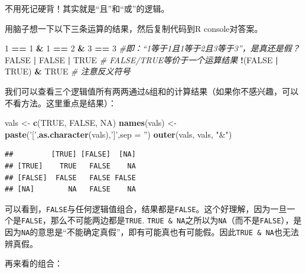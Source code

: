 \documentclass[]{book}
\newenvironment{Shaded}{\begin{snugshade}}{\end{snugshade}}
\newcommand{\CommentTok}[1]{\textcolor[rgb]{0.56,0.35,0.01}{\textit{#1}}}
\newcommand{\DataTypeTok}[1]{\textcolor[rgb]{0.13,0.29,0.53}{#1}}
\newcommand{\DecValTok}[1]{\textcolor[rgb]{0.00,0.00,0.81}{#1}}
\newcommand{\KeywordTok}[1]{\textcolor[rgb]{0.13,0.29,0.53}{\textbf{#1}}}
\newcommand{\NormalTok}[1]{#1}
\newcommand{\OperatorTok}[1]{\textcolor[rgb]{0.81,0.36,0.00}{\textbf{#1}}}
\newcommand{\OtherTok}[1]{\textcolor[rgb]{0.56,0.35,0.01}{#1}}
\newcommand{\StringTok}[1]{\textcolor[rgb]{0.31,0.60,0.02}{#1}}
\begin{document}
不用死记硬背！其实就是``且''和``或''的逻辑。

用脑子想一下以下三条运算的结果，然后复制代码到R console对答案。

\begin{Shaded}
\begin{Highlighting}[]
\DecValTok{1} \OperatorTok{==}\StringTok{ }\DecValTok{1} \OperatorTok{&}\StringTok{ }\DecValTok{1} \OperatorTok{==}\StringTok{ }\DecValTok{2} \OperatorTok{&}\StringTok{ }\DecValTok{3} \OperatorTok{==}\StringTok{ }\DecValTok{3} \CommentTok{#即：“1等于1且1等于2且3等于3”，是真还是假？}
\OtherTok{FALSE} \OperatorTok{|}\StringTok{ }\OtherTok{FALSE} \OperatorTok{|}\StringTok{ }\OtherTok{TRUE} \CommentTok{# FALSE/TRUE等价于一个运算结果}
\OperatorTok{!}\NormalTok{(}\OtherTok{FALSE} \OperatorTok{|}\StringTok{ }\OtherTok{TRUE}\NormalTok{) }\OperatorTok{&}\StringTok{ }\OtherTok{TRUE} \CommentTok{# 注意反义符号}
\end{Highlighting}
\end{Shaded}

我们可以查看三个逻辑值所有两两通过\texttt{\&}组和的计算结果（如果你不感兴趣，可以不看方法。这里重点是结果）：

\begin{Shaded}
\begin{Highlighting}[]
\NormalTok{vals <-}\StringTok{ }\KeywordTok{c}\NormalTok{(}\OtherTok{TRUE}\NormalTok{, }\OtherTok{FALSE}\NormalTok{, }\OtherTok{NA}\NormalTok{) }
\KeywordTok{names}\NormalTok{(vals) <-}\StringTok{ }\KeywordTok{paste}\NormalTok{(}\StringTok{'['}\NormalTok{,}\KeywordTok{as.character}\NormalTok{(vals),}\StringTok{']'}\NormalTok{,}\DataTypeTok{sep =} \StringTok{''}\NormalTok{)}
\KeywordTok{outer}\NormalTok{(vals, vals, }\StringTok{"&"}\NormalTok{)}
\end{Highlighting}
\end{Shaded}

\begin{verbatim}
##         [TRUE] [FALSE]  [NA]
## [TRUE]    TRUE   FALSE    NA
## [FALSE]  FALSE   FALSE FALSE
## [NA]        NA   FALSE    NA
\end{verbatim}

可以看到，\texttt{FALSE}与任何逻辑值组合，结果都是\texttt{FALSE}。这个好理解，因为一旦一个是\texttt{FALSE}，那么不可能两边都是\texttt{TRUE}. \texttt{TRUE\ \&\ NA}之所以为\texttt{NA}（而不是\texttt{FALSE}），是因为\texttt{NA}的意思是``不能确定真假''，即有可能真也有可能假。因此\texttt{TRUE\ \&\ NA}也无法辨真假。

再来看\texttt{\textbar{}}的组合：
\end{document}
